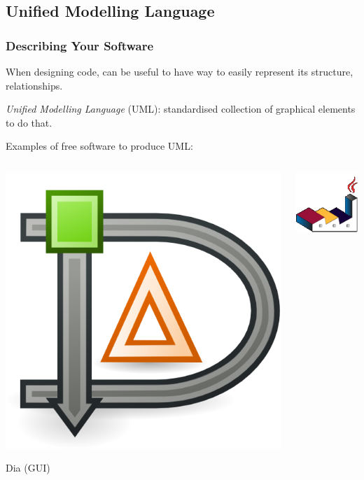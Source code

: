 \documentclass[12pt]{beamer}
\begin{document}
\subsection{Unified Modelling Language}

\begin{frame}
  \frametitle{Describing Your Software}
  When designing code, can be useful to have way to easily represent
  its structure, relationships.
  
  
  \vspace{3mm}
  \textit{Unified Modelling Language} (UML): standardised
  collection of graphical elements to do that.%
  
  \vspace{3mm}
  Examples of free software to produce UML:
  
  \begin{columns}
    \begin{column}{0.5\textwidth}
      \centering
      \includegraphics[height=0.2\textheight]{dia.png}
      
      Dia (GUI)
    \end{column}
    \begin{column}{0.5\textwidth}
      \centering
      \includegraphics[height=0.2\textheight]{plantuml.png}
      

\end{column}
\end{columns}
\end{frame}
\end{document}
